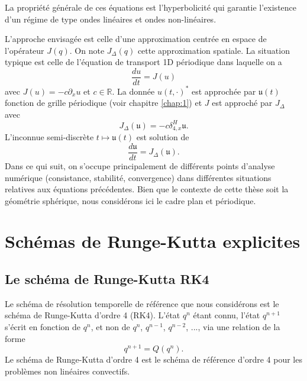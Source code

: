 La propriété générale de ces équations est l'hyperbolicité qui garantie l'existence d'un régime de type ondes linéaires et ondes non-linéaires.

L'approche envisagée est celle d'une approximation centrée en espace de l'opérateur $J(q)$. On note $J_{\Delta}(q)$ cette approximation spatiale. La situation typique est celle de l'équation de transport 1D périodique dans laquelle on a
\begin{equation}
\dfrac{d u}{dt} = J (u)
\label{eq:edo}
\end{equation}
avec $J(u) = - c \partial_x u$ et $c \in \mathbb{R}$. La donnée $u(t,\cdot)^*$ est approchée par $\mathfrak{u}(t)$ fonction de grille périodique (voir chapitre \ref{chap:1}) et $J$ est approché par $J_{\Delta}$ avec
\begin{equation}
J_{\Delta}(\mathfrak{u}) = - c \delta_{4,x}^H \mathfrak{u}.
\end{equation}
L'inconnue semi-discrète $t \mapsto \mathfrak{u}(t)$ est solution de 
\begin{equation}
\dfrac{d \mathfrak{u}}{dt} = J_{\Delta}(\mathfrak{u}).
\end{equation}
Dans ce qui suit, on s'occupe principalement de différents points d’analyse numérique (consistance, stabilité, convergence) dans différentes situations relatives aux équations précédentes. Bien que le
contexte de cette thèse soit la géométrie sphérique, nous considérons ici le cadre plan et périodique.















\section{Schémas de Runge-Kutta explicites}

\subsection{Le schéma de Runge-Kutta RK4}

Le schéma de résolution temporelle de référence que nous considérons est le schéma de Runge-Kutta d'ordre 4 (RK4). L'état $q^n$ étant connu, l'état $q^{n+1}$ s'écrit en fonction de $q^n$, et non de $q^n$, $q^{n-1}$, $q^{n-2}$, ..., via une relation de la forme
\begin{equation}
q^{n+1} = Q(q^n).
\label{eq:recurrence_rk}
\end{equation}
Le schéma de Runge-Kutta d'ordre 4 est le schéma de référence d'ordre 4 pour les problèmes non linéaires convectifs. 

